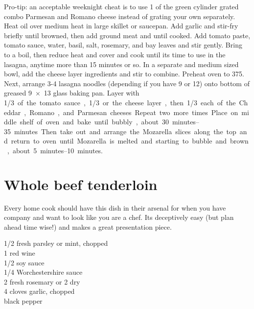 \noindent Pro-tip: an acceptable weeknight cheat is to use \SI{1}{\cup} of the green cylinder grated combo Parmesan and Romano cheese instead of grating your own separately.  \\

Heat oil over medium heat in large skillet or saucepan. Add garlic and stir-fry briefly until browned, then add ground meat and \saute until cooked. Add tomato paste, tomato sauce, water, basil, salt, rosemary, and bay leaves and stir gently. Bring to a boil, then reduce heat and cover and cook until its time to use in the lasagna, anytime more than 15 minutes or so. In a separate and medium sized bowl, add the cheese layer ingredients and stir to combine. Preheat oven to \SI{375}{\degreeF}. Next, arrange 3-4 lasagna noodles (depending if you have 9 or 12) onto bottom of greased \SI{9x13}{\inch} glass baking pan. Layer with \SI{1/3} of the tomato sauce, \SI{1/3} or the cheese layer, then \SI{1/3}  each of the Cheddar, Romano, and Parmesan cheeses. Repeat two more times. Place on middle shelf of oven and bake until bubbly, about \SIrange{30}{35}{minutes}. Then take out and arrange the Mozarella slices along the top and return to oven until Mozarella is melted and starting to bubble and brown, about  \SIrange{5}{10}{minutes}.

\section{Whole beef tenderloin}

\begin{open}
Every home cook should have this dish in their arsenal for when you have company and want to look like you are a chef. Its deceptively easy (but plan ahead time wise!) and makes a great presentation piece. 
\end{open}
 
\begin{ingredients}
    \SI{1/2}{\cup} fresh parsley or mint, chopped\\
    \SI{1}{\cup} red wine\\
    \SI{1/2}{\cup} soy sauce\\
    \SI{1/4}{\cup} Worchestershire sauce\\
    \SI{2}{\tblspoon} fresh rosemary or \SI{2}{\teaspoon} dry\\
    4 cloves garlic, chopped\\
    black pepper\\
    
\end{ingredients}

